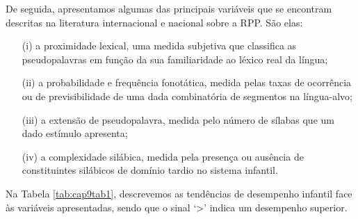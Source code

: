 \documentclass[output=paper,colorlinks,citecolor=brown,booklanguage=portuguese]{langscibook}
\begin{document}
De seguida, apresentamos algumas das principais variáveis que se encontram descritas na literatura internacional e nacional sobre a RPP. São elas:

\begin{enumerate}[align=left]
\item[(i)] a proximidade lexical, uma medida subjetiva que classifica as pseudopalavras em função da sua familiaridade ao léxico real da língua;

\item[(ii)] a probabilidade e frequência fonotática, medida pelas taxas de ocorrência ou de previsibilidade de uma dada combinatória de segmentos na língua-alvo;

\item[(iii)] a extensão de pseudopalavra, medida pelo número de sílabas que um dado estímulo apresenta;

\item[(iv)] a complexidade silábica, medida pela presença ou ausência de constituintes silábicos de domínio tardio no sistema infantil.
\end{enumerate}

Na Tabela \ref{tab:cap9tab1}, descrevemos as tendências de desempenho infantil face às variáveis apresentadas, sendo que o sinal ‘>’ indica um desempenho superior.
\end{document}
